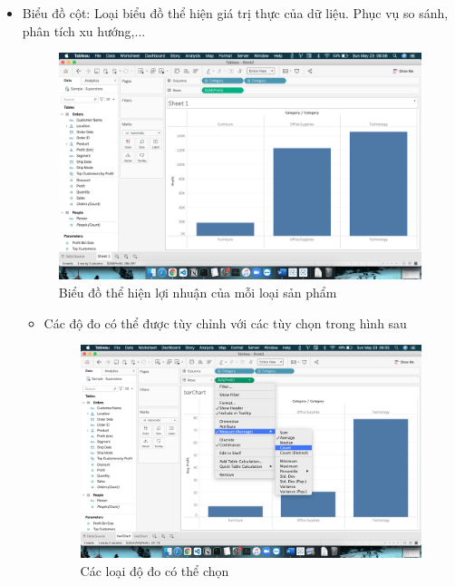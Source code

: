 \documentclass[a4paper, 12pt]{article}
\begin{document}
\begin{itemize}
    \item Biểu đồ cột: Loại biểu đồ thể hiện giá trị thực của dữ liệu. Phục vụ so sánh, phân tích xu hướng,...
    \begin{figure}[H]
        \begin{center}
            \includegraphics[scale=0.3]{img/barChart.png}
            \caption{Biểu đồ thể hiện lợi nhuận của mỗi loại sản phẩm}
        \end{center}
    \end{figure}

    \begin{itemize}


        \item Các độ đo có thể được tùy chỉnh với các tùy chọn trong hình sau
        \begin{figure}[H]
            \begin{center}
                \includegraphics[scale=0.3]{img/measure.png}
                \caption{Các loại độ đo có thể chọn}
            \end{center}
        \end{figure}


\end{itemize}
\end{itemize}
\end{document}
